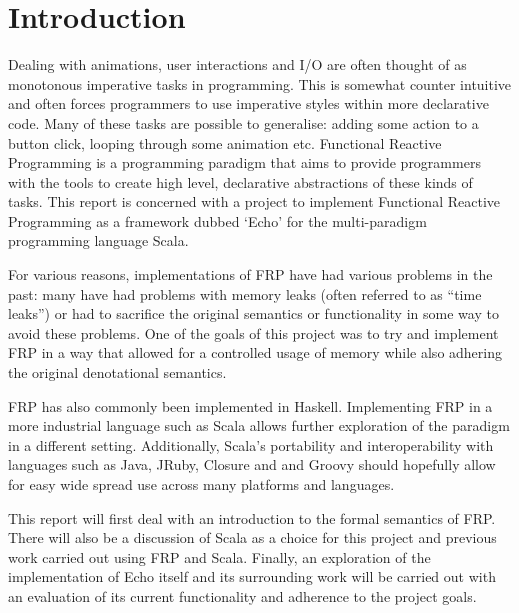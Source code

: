 \chapter{Introduction}

  Dealing with animations, user interactions and I/O are often thought of as monotonous imperative tasks
  in programming. This is somewhat counter intuitive and often forces programmers to use imperative
  styles within more declarative code. Many of these tasks are possible to generalise: adding
  some action to a button click, looping through some animation etc. Functional Reactive Programming
  is a programming paradigm that aims to provide programmers with the tools to create high level,
  declarative abstractions of these kinds of tasks. This report is concerned with a project to
  implement Functional Reactive Programming as a framework dubbed `Echo' \cite{Stott} for the multi-paradigm programming language
  Scala.

  For various reasons, implementations of FRP have had various problems in the past: many have had problems
  with memory leaks (often referred to as ``time leaks'') or had to sacrifice the original semantics or functionality in some way to avoid these problems. One of the goals
  of this project was to try and implement FRP in a way that allowed for a controlled usage of memory while also
  adhering the original denotational semantics. 
  
  FRP
  has also commonly been implemented in Haskell. Implementing FRP in a more industrial language such as Scala allows
  further exploration of the paradigm in a different setting. Additionally, Scala's portability and interoperability with
  languages such as Java, JRuby, Closure and and Groovy should hopefully allow for easy wide spread use across many platforms and languages. 

  This report will first deal with an introduction to the formal semantics of FRP. There will also be a discussion of Scala as a 
  choice for this project and previous work carried out using FRP and Scala.
  Finally, an exploration of the implementation of Echo itself and its surrounding work will be carried out with an
  evaluation of its current functionality and adherence to the project goals.